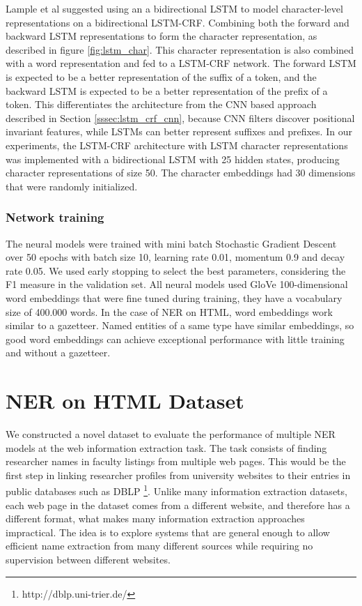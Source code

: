\documentclass[sigconf]{acmart}
\begin{document}
Lample et al \cite{Lample2016} suggested using an a bidirectional LSTM to model character-level 
representations on a bidirectional LSTM-CRF. Combining both the forward and backward 
LSTM representations to form the character representation, as described in figure \ref{fig:lstm_char}. 
This character representation is also combined with a word representation and fed to a LSTM-CRF network. 
The forward LSTM is expected to be a better
representation of the suffix of a token, and the backward LSTM is expected to be a
better representation of the prefix of a token. This differentiates the architecture
from the CNN based approach described in Section \ref{sssec:lstm_crf_cnn}, because CNN filters 
discover positional invariant features, while LSTMs can better represent suffixes and prefixes. In our experiments, 
the LSTM-CRF architecture with LSTM character representations was implemented with a bidirectional LSTM
with 25 hidden states, producing character representations of size 50. The character embeddings
had 30 dimensions that were randomly initialized.

\subsubsection{Network training}

The neural models were trained with mini batch Stochastic Gradient Descent over 50 epochs with batch size 10,
learning rate 0.01, momentum 0.9 and decay rate 0.05. We used early stopping \cite{Caruana2000} to select the best 
parameters, considering the F1 measure in the validation set. All neural models used 
GloVe 100-dimensional word embeddings \cite{Pennington2014} that were fine tuned during training,
they have a vocabulary size of 400.000 words.
In the case of NER on HTML, word embeddings work similar to a gazetteer. Named entities 
of a same type have similar embeddings, so good word embeddings can achieve exceptional 
performance with little training and without a gazetteer. 

\section{NER on HTML Dataset}

We constructed a novel dataset to evaluate the performance of multiple NER models
at the web information extraction task. The task consists of finding researcher
names in faculty listings from multiple web pages. This would be the 
first step in linking researcher profiles from university websites to their entries
in public databases such as DBLP \footnote{http://dblp.uni-trier.de/}. Unlike many
information extraction datasets, each web page in the dataset comes from a different 
website, and therefore has a different format, what makes many information
extraction approaches impractical. The idea is to explore systems that are general 
enough to allow efficient name extraction from many different sources while requiring
no supervision between different websites. 
\end{document}
